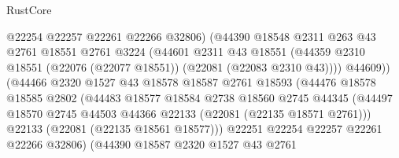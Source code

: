 \begin{lexlean}{RustCore}
\begin{coremodule}
                                @22254
                                @22257
                                @22261
                                @22266
                                @32806)
                              (@44390
                                @18548
                                @2311
                                @263
                                @43
                                @2761
                                @18551
                                @2761
                                @3224
                                (@44601
                                  @2311
                                  @43
                                  @18551
                                  (@44359
                                    @2310
                                    @18551
                                    (@22076 (@22077 @18551))
                                    (@22081 (@22083 @2310 @43))))
                                @44609))
                            (@44466
                              @2320
                              @1527
                              @43
                              @18578
                              @18587
                              @2761
                              @18593
                              (@44476
                                @18578
                                @18585
                                @2802
                                (@44483
                                  @18577
                                  @18584
                                  @2738
                                  @18560
                                  @2745
                                  @44345
                                  (@44497
                                    @18570
                                    @2745
                                    @44503
                                    @44366
                                    @22133
                                    (@22081 (@22135 @18571 @2761)))
                                  @22133
                                  (@22081 (@22135 @18561 @18577)))
                                @22251
                                @22254
                                @22257
                                @22261
                                @22266
                                @32806)
                              (@44390
                                @18587
                                @2320
                                @1527
                                @43
                                @2761

\end{coremodule}
\end{lexlean}
